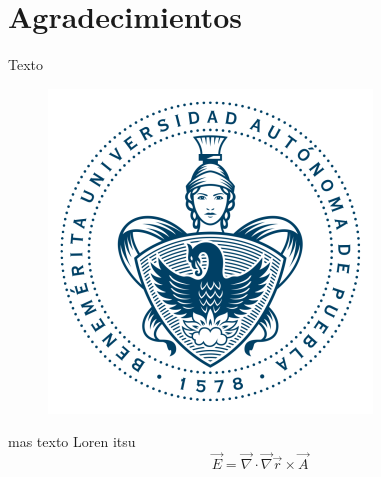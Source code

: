 \chapter{Agradecimientos}
Texto
\begin{figure}[!h]
\centering
\includegraphics[width=.2\textwidth,keepaspectratio=true]{escudo-2}
\end{figure}

mas texto Loren itsu
\[ \vec E = \vec \nabla \cdot \vec \nabla \vec r \times \vec A
\]
